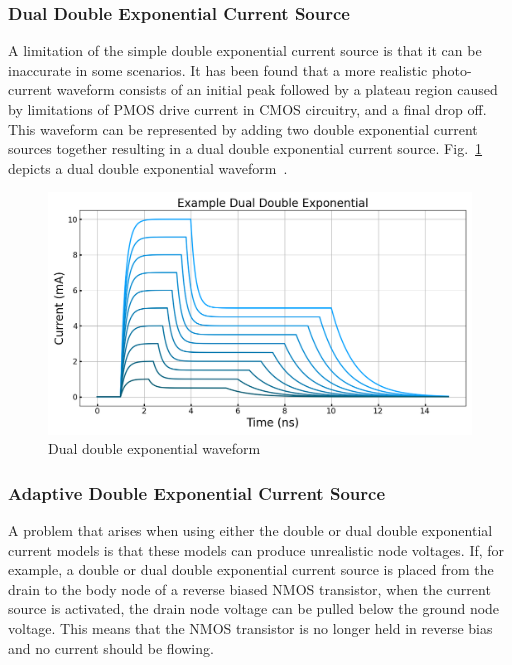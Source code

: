 \documentclass[conference]{IEEEtran}
\begin{document}
    \vspace{1em}

    \subsubsection{Dual Double Exponential Current Source}
    A limitation of the simple double exponential current source is that it can be inaccurate in some scenarios.
    It has been found that a more realistic photo-current waveform consists of an initial peak followed by a plateau region caused by limitations of PMOS drive current in CMOS circuitry, and a final drop off.
    This waveform can be represented by adding two double exponential current sources together resulting in a dual double exponential current source.
    Fig.~\ref{fig:dual_double_exp} depicts a dual double exponential waveform~\cite{Black2015}.

    \begin{figure}[htbp]
        \centering
        \includegraphics[width=0.95\linewidth]{EX_Dual_Double_Exponential}
        \caption{Dual double exponential waveform}
        \label{fig:dual_double_exp}
    \end{figure}

    \subsubsection{Adaptive Double Exponential Current Source}
    A problem that arises when using either the double or dual double exponential current models is that these models can produce unrealistic node voltages.
    If, for example, a double or dual double exponential current source is placed from the drain to the body node of a reverse biased NMOS transistor, when the current source is activated, the drain node voltage can be pulled below the ground node voltage.
    This means that the NMOS transistor is no longer held in reverse bias and no current should be flowing.
\end{document}
